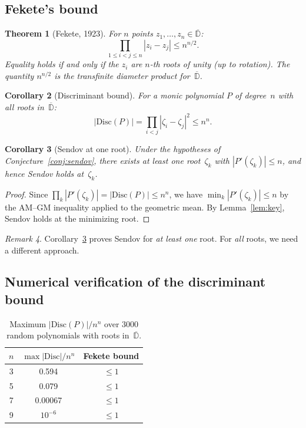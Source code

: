 \documentclass[11pt,a4paper]{article}
\newtheorem{theorem}{Theorem}[section]
\newtheorem{corollary}[theorem]{Corollary}
\theoremstyle{definition}
\theoremstyle{remark}
\newtheorem{remark}[theorem]{Remark}
\begin{document}
\subsection{Fekete's bound}

\begin{theorem}[Fekete, 1923]
\label{thm:fekete}
For $n$ points $z_1, \ldots, z_n \in \overline{\mathbb{D}}$:
\[
\prod_{1 \leq i < j \leq n} |z_i - z_j| \leq n^{n/2}.
\]
Equality holds if and only if the $z_i$ are $n$-th roots of unity (up to rotation).  The quantity $n^{n/2}$ is the transfinite diameter product for~$\overline{\mathbb{D}}$.
\end{theorem}

\begin{corollary}[Discriminant bound]
\label{cor:disc}
For a monic polynomial $P$ of degree~$n$ with all roots in~$\overline{\mathbb{D}}$:
\[
|\mathrm{Disc}(P)| = \prod_{i < j} |\zeta_i - \zeta_j|^2 \leq n^n.
\]
\end{corollary}

\begin{corollary}[Sendov at one root]
\label{cor:sendov_one}
Under the hypotheses of Conjecture~\ref{conj:sendov}, there exists at least one root~$\zeta_k$ with $|P'(\zeta_k)| \leq n$, and hence Sendov holds at~$\zeta_k$.
\end{corollary}

\begin{proof}
Since $\prod_k |P'(\zeta_k)| = |\mathrm{Disc}(P)| \leq n^n$, we have $\min_k |P'(\zeta_k)| \leq n$ by the AM--GM inequality applied to the geometric mean.  By Lemma~\ref{lem:key}, Sendov holds at the minimizing root.
\end{proof}

\begin{remark}
Corollary~\ref{cor:sendov_one} proves Sendov for \emph{at least one} root.  For \emph{all} roots, we need a different approach.
\end{remark}

\subsection{Numerical verification of the discriminant bound}

\begin{table}[h]
\centering
\caption{Maximum $|\mathrm{Disc}(P)|/n^n$ over $3000$ random polynomials with roots in~$\overline{\mathbb{D}}$.}
\label{tab:disc}
\begin{tabular}{ccc}
\toprule
$n$ & $\max |\mathrm{Disc}|/n^n$ & Fekete bound \\
\midrule
3 & 0.594 & $\leq 1$ \\
5 & 0.079 & $\leq 1$ \\
7 & 0.00067 & $\leq 1$ \\
9 & $10^{-6}$ & $\leq 1$ \\
\bottomrule
\end{tabular}
\end{table}
\end{document}
